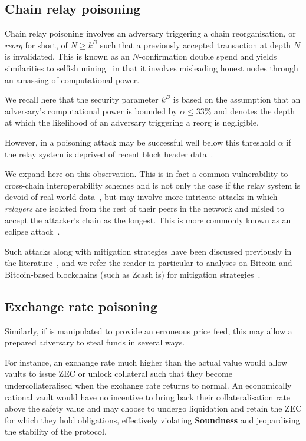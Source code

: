 \subsection{Chain relay poisoning}
\label{sec:relay_poisoning}

Chain relay poisoning involves an adversary triggering a chain reorganisation, or \emph{reorg} for short, of $N \geq k^B$ such that a previously accepted transaction at depth $N$ is invalidated.
This is known as an $N$-confirmation double spend and yields similarities to selfish mining~\cite{eyal2014majority} in that it involves misleading honest nodes through an amassing of computational power.

We recall here that the security parameter $k^B$ is based on the assumption that an adversary's computational power is bounded by $\alpha \leq 33\%$ and denotes the depth at which the likelihood of an adversary triggering a reorg is negligible.

However, in \xclaim a poisoning attack may be successful well below this threshold $\alpha$ if the relay system is deprived of recent block header data~\cite[Section VII-A]{zamyatin2019xclaim}.

We expand here on this observation.
This is in fact a common vulnerability to cross-chain interoperability schemes and is not only the case if the relay system is devoid of real-world data~\cite{2017hijackingbtc}, but may involve more intricate attacks in which \emph{relayers} are isolated from the rest of their peers in the network and misled to accept the attacker's chain as the longest.
This is more commonly known as an eclipse attack~\cite{heilman2015eclipse}.

Such attacks along with mitigation strategies have been discussed previously in the literature~\cite{heilman2015eclipse,wust2016ethereum,xu2020eclipsed,alangot2020decentralized}, and we refer the reader in particular to analyses on Bitcoin and Bitcoin-based blockchains (such as Zcash is) for mitigation strategies~\cite{heilman2015eclipse,alangot2020decentralized}.

\subsection{Exchange rate poisoning}
\label{sec:er_poisoning}

Similarly, if \oxr is manipulated to provide an erroneous price feed, this may allow a prepared adversary to steal funds in several ways.

For instance, an exchange rate much higher than the actual value would allow vaults to issue ZEC or unlock collateral such that they become undercollateralised when the exchange rate returns to normal.
An economically rational vault would have no incentive to bring back their collateralisation rate above the safety value and may choose to undergo liquidation and retain the ZEC for which they hold obligations, effectively violating \textbf{Soundness} and jeopardising the stability of the protocol.

